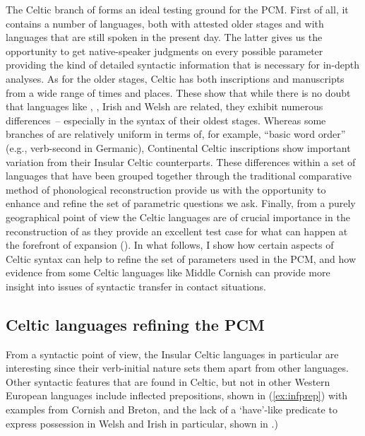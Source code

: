 \documentclass[output=paper,colorlinks,citecolor=brown]{langscibook}
\begin{document}
The Celtic branch of  forms an ideal testing ground for the PCM. First of all, it contains a number of languages, both with attested older stages and with languages that are still spoken in the present day. The latter gives us the opportunity to get native-speaker judgments on every possible parameter providing the kind of detailed syntactic information that is necessary for in-depth analyses. As for the older stages, Celtic has both inscriptions and manuscripts from a wide range of times and places. These show that while there is no doubt that languages like , , Irish and Welsh are related, they exhibit numerous differences~-- especially in the syntax of their oldest stages. Whereas some branches of  are relatively uniform in terms of, for example, “basic word order” (e.g., verb-second in Germanic), Continental Celtic inscriptions show important variation from their Insular Celtic counterparts. These differences within a set of languages that have been grouped together through the traditional comparative method of phonological reconstruction provide us with the opportunity to enhance and refine the set of parametric questions we ask. Finally, from a purely geographical point of view the Celtic languages are of crucial importance in the reconstruction of  as they provide an excellent test case for what can happen at the forefront of  expansion (\citealt{mm:ramprasadmeelen2022}). In what follows, I show how certain aspects of Celtic syntax can help to refine the set of parameters used in the PCM, and how evidence from some Celtic languages like Middle Cornish  can provide more insight into issues of syntactic transfer in contact situations.

\subsection{Celtic languages refining the PCM}
\label{sec:celticrefiningPCM}

From a syntactic point of view, the Insular Celtic languages in particular are interesting since their verb-initial nature sets them apart from other  languages. Other syntactic features that are found in Celtic, but not in other Western European languages include inflected prepositions, shown in (\ref{ex:infprep}) with examples from Cornish and Breton, and the lack of a `have'-like predicate to express possession in Welsh and Irish in particular, shown in .) 
\end{document}
